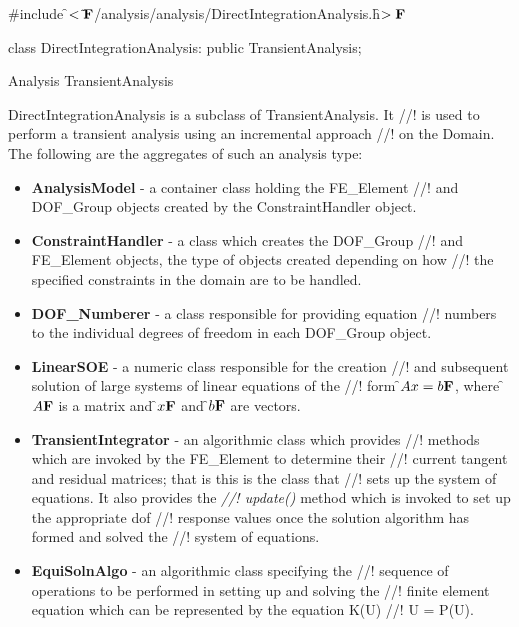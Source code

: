 
\indent \#include \f$<\tilde{ }{\bf F}$/analysis/analysis/DirectIntegrationAnalysis.h\f$>{\bf F}$

\indent class DirectIntegrationAnalysis: public TransientAnalysis;

\indent Analysis
\indent\indent TransientAnalysis
\indent\indent{}

\indent DirectIntegrationAnalysis is a subclass of TransientAnalysis. It
//! is used to perform a transient analysis using an incremental approach
//! on the Domain. The following are the aggregates of such an analysis type: 
\begin{itemize}
\item {\bf AnalysisModel} - a container class holding the FE\_Element
//! and DOF\_Group objects created by the ConstraintHandler object. 
\item {\bf ConstraintHandler} - a class which creates the DOF\_Group
//! and FE\_Element objects, the type of objects created depending on how
//! the specified constraints in the domain are to be handled. 
\item {\bf DOF\_Numberer} - a class responsible for providing equation
//! numbers to the individual degrees of freedom in each DOF\_Group object.
\item {\bf LinearSOE} - a numeric class responsible for the creation
//! and subsequent solution of large systems of linear equations of the
//! form \f$Ax = b{\bf F}$, where \f$A{\bf F}$ is a matrix and \f$x{\bf F}$ and \f$b{\bf F}$ are vectors.
\item {\bf TransientIntegrator} - an algorithmic class which provides
//! methods which are invoked by the FE\_Element to determine their
//! current tangent and residual matrices; that is this is the class that
//! sets up the system of equations.  It also provides the {\em
//! update()} method which is invoked to set up the appropriate dof
//! response values once the solution algorithm has formed and solved the
//! system of equations.
\item {\bf EquiSolnAlgo} - an algorithmic class specifying the
//! sequence of operations to be performed in setting up and solving the
//! finite element equation which can be represented by the equation K(U)
//! U = P(U). 
\end{itemize}


